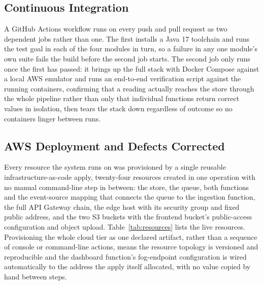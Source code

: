 \documentclass[conference]{IEEEtran}
\begin{document}
\subsection{Continuous Integration}

A GitHub Actions workflow runs on every push and pull request as two dependent jobs rather than one. The first installs a Java 17 toolchain and runs the test goal in each of the four modules in turn, so a failure in any one module's own suite fails the build before the second job starts. The second job only runs once the first has passed: it brings up the full stack with Docker Compose \cite{ref15} against a local AWS emulator and runs an end-to-end verification script against the running containers, confirming that a reading actually reaches the store through the whole pipeline rather than only that individual functions return correct values in isolation, then tears the stack down regardless of outcome so no containers linger between runs.

\subsection{AWS Deployment and Defects Corrected}

Every resource the system runs on was provisioned by a single reusable infrastructure-as-code apply, twenty-four resources created in one operation with no manual command-line step in between: the store, the queue, both functions and the event-source mapping that connects the queue to the ingestion function, the full API Gateway chain, the edge host with its security group and fixed public address, and the two S3 buckets with the frontend bucket's public-access configuration and object upload. Table~\ref{tab:resources} lists the live resources. Provisioning the whole cloud tier as one declared artifact, rather than a sequence of console or command-line actions, means the resource topology is versioned and reproducible and the dashboard function's fog-endpoint configuration is wired automatically to the address the apply itself allocated, with no value copied by hand between steps.
\end{document}
